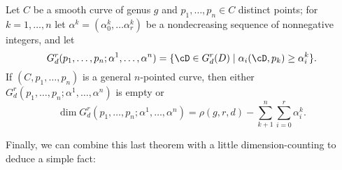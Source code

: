 %

\begin{theorem}\label{BN with inflection and dimension}
Let $C$ be a smooth curve of genus $g$ and $p_1,\dots,p_n \in C$ distinct points; for $k = 1,\dots,n$ let $\alpha^k = (\alpha^k_0,\dots\alpha^k_r)$ be a nondecreasing sequence of nonnegative integers, and let
$$
G^r_d(p_1,\dots,p_n; \alpha^1,\dots,\alpha^n) = \{\cD \in G^r_d(D) \mid \alpha_i(\cD, p_k) \geq \alpha^k_i \}.
$$
If $(C, p_1,\dots,p_n)$ is a general $n$-pointed curve, then either $G^r_d(p_1,\dots,p_n; \alpha^1,\dots,\alpha^n)$ is empty or
$$
\dim G^r_d(p_1,\dots,p_n; \alpha^1,\dots,\alpha^n) = \rho(g,r,d) - \sum_{k+1}^n \sum_{i=0}^r \alpha^k_i.
$$
\end{theorem}

Finally, we can combine this last theorem with a little dimension-counting to deduce a simple fact:

